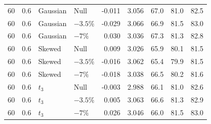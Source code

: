 \begin{table}[H]
\begin{tabular*}{\textwidth}{@{\extracolsep{\fill}}rrllrrrrr}
60 & 0.6 & Gaussian & Null & -0.011 & 3.056 & 67.0 & 81.0 & 82.5 \\
60 & 0.6 & Gaussian & $-3.5\%$ & -0.029 & 3.066 & 66.9 & 81.5 & 83.0 \\
60 & 0.6 & Gaussian & $-7\%$ & 0.030 & 3.036 & 67.3 & 81.3 & 82.8 \\
60 & 0.6 & Skewed & Null & 0.009 & 3.026 & 65.9 & 80.1 & 81.5 \\
60 & 0.6 & Skewed & $-3.5\%$ & -0.016 & 3.062 & 65.4 & 79.9 & 81.5 \\
60 & 0.6 & Skewed & $-7\%$ & -0.018 & 3.038 & 66.5 & 80.2 & 81.6 \\
60 & 0.6 & $t_3$ & Null & -0.003 & 2.988 & 66.1 & 81.0 & 82.6 \\
60 & 0.6 & $t_3$ & $-3.5\%$ & 0.005 & 3.063 & 66.6 & 81.3 & 82.9 \\
60 & 0.6 & $t_3$ & $-7\%$ & 0.026 & 3.046 & 66.0 & 81.5 & 83.0 \\
\bottomrule
\end{tabular*}
\end{table}

